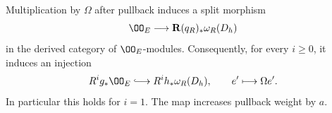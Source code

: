 \begin{lemma}\label{bl:lem:residue-injection}
Multiplication by $\Omega$ after pullback induces a split morphism
\begin{equation}\label{bl:cov:derived-split}
 \OO_E\longrightarrow \mathbf R(q_R)_*\omega_R(D_h)
\end{equation}
in the derived category of $\OO_E$-modules.  Consequently, for every
$i\geq0$, it induces an injection
\begin{equation}\label{bl:cov:injections}
 R^ig_*\OO_E\lhook\joinrel\longrightarrow
 R^ih_*\omega_R(D_h),\qquad e'\longmapsto\Omega e'.
\end{equation}
In particular this holds for $i=1$.  The map increases pullback
weight by $a$.
\end{lemma}


